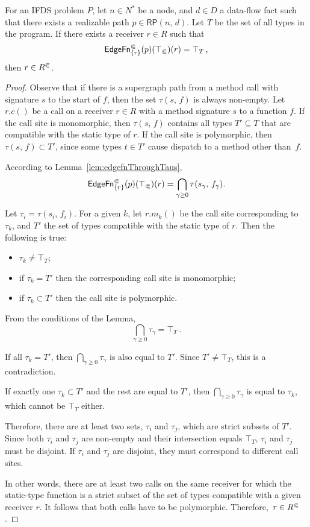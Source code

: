 \begin{lemma}\label{lem:ccrectop}
   For an IFDS problem $P$, let $n\in N^*$ be a node, and $d\in D$ a data-flow fact such that there exists a realizable path $p\in\textsf{RP}(n,\,d)$. Let $T$ be the set of all types in the program.
   If there exists a receiver $r\in R$ such that
  \[
    \textsf{EdgeFn}^\Subset_{\{r\}}(p)(\top_\Subset)(r)=\top_T\,,                       
  \]
  then $r\in {R^\Subset}$.
\end{lemma}
\begin{proof} 
Observe that if there is a supergraph path from a method call with signature $s$ to the start of $f$, then the set $\tau(s,\,f)$ is always non-empty.
  Let $r.c()$ be a call on a receiver $r\in R$ with a method signature $s$ to a function $f$.
  If the call site is monomorphic, then $\tau(s,\,f)$ contains all types $T'\subseteq T$ that are compatible with the static type of $r$.
  If the call site is polymorphic, then $\tau(s,\,f)\subset T'$, since some types $t\in T'$ cause dispatch to a method other than~$f$.
 
 According to Lemma~\ref{lem:edgefnThroughTaus},
 \[
   \textsf{EdgeFn}^\Subset_{\{r\}}(p)(\top_\Subset)(r)=
      \bigcap_{\gamma\ge0}\tau(s_\gamma,\,f_\gamma).
 \]
 
Let $\tau_i=\tau(s_i,\,f_i)$. 
 For a given $k$, let $r.m_k()$ be the call site corresponding to $\tau_k$, and $T'$ the set of types compatible with the static type of $r$. Then the following is true:
 \begin{itemize}
   \item $\tau_k\ne\top_T$;
   \item if $\tau_k=T'$ then the corresponding call site is monomorphic;
   \item if $\tau_k\subset T'$ then the call site is polymorphic.
 \end{itemize}  
 
 From the conditions of the Lemma, 
 \begin{equation}
   \bigcap_{\gamma\ge 0}\tau_\gamma=\top_T\,.
 \end{equation} 
 
 If all $\tau_k=T'$, then $\bigcap_{\gamma\ge 0}\tau_\gamma$ is also equal to $T'$. Since $T'\ne\top_T$, this is a contradiction. 
 
 If exactly one $\tau_k\subset T'$ and the rest are equal to $T'$, then $\bigcap_{\gamma\ge 0}\tau_\gamma$ is equal to $\tau_k$, which cannot be $\top_T$ either.
 
 Therefore, there are at least two sets, $\tau_i$ and $\tau_j$, which are strict subsets of $T'$. Since both $\tau_i$ and $\tau_j$ are non-empty and their intersection equals $\top_T$, $\tau_i$ and $\tau_j$ must be disjoint. If $\tau_i$ and $\tau_j$ are disjoint, they must correspond to different call sites.
 
 In other words, there are at least two calls on the same receiver for which the static-type function is a strict subset of the set of types compatible with a given receiver $r$. It follows that both calls have to be polymorphic. Therefore,~${r\in{R^\Subset}}$.
\end{proof}

